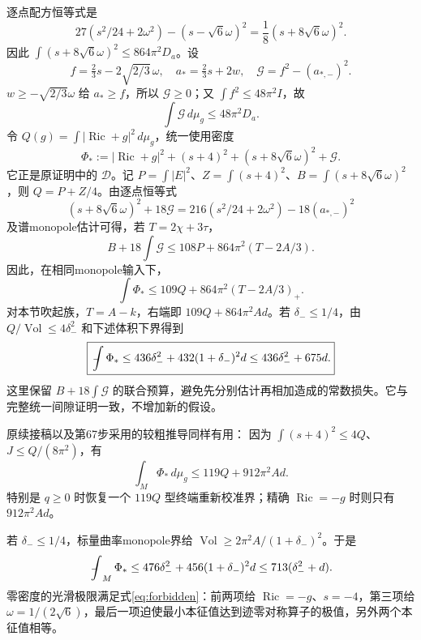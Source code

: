 \documentclass[UTF8,a4paper,11pt,fontset=fandol]{ctexart}
\numberwithin{equation}{section}
\theoremstyle{definition}
\newcommand{\Ric}{\operatorname{Ric}}
\newcommand{\Vol}{\operatorname{Vol}}
\newcommand{\dd}{\,d\mu_g}
\newcommand{\fint}{\mathop{\rlap{\,\raisebox{0.1ex}{\tiny$-$}}\int}\nolimits}
\begin{document}
逐点配方恒等式是
\begin{equation}\label{eq:square}
27(s^2/24+2\omega^2)-(s-\sqrt6\omega)^2
=\frac18(s+8\sqrt6\omega)^2.
\end{equation}
因此 $\int(s+8\sqrt6\omega)^2\le864\pi^2D_a$。设
\[
f=\tfrac23s-2\sqrt{2/3}\,\omega,\quad a_*=\tfrac23s+2w,
\quad\mathcal G=f^2-(a_{*,-})^2.
\]
$w\ge-\sqrt{2/3}\omega$ 给 $a_*\ge f$，所以 $\mathcal G\ge0$；又 $\int f^2\le48\pi^2I$，故
\begin{equation}
\int\mathcal G\dd\le48\pi^2D_a.
\end{equation}
令 $Q(g)=\int|\Ric+g|^2\dd$，统一使用密度
\begin{equation}\label{eq:Phistar}
\Phi_*:=|\Ric+g|^2+(s+4)^2+(s+8\sqrt6\omega)^2+\mathcal G.
\end{equation}
它正是原证明中的 $\mathcal D$。记 $P=\int|E|^2$、$Z=\int(s+4)^2$、$B=\int(s+8\sqrt6\omega)^2$，则 $Q=P+Z/4$。由逐点恒等式
\begin{equation}\label{eq:joint-density-identity}
(s+8\sqrt6\omega)^2+18\mathcal G
=216(s^2/24+2\omega^2)-18(a_{*,-})^2
\end{equation}
及谱monopole估计可得，若 $T=2\chi+3\tau$，
\[
B+18\int\mathcal G\le108P+864\pi^2(T-2A/3).
\]
因此，在相同monopole输入下，
\begin{equation}\label{eq:109}
\boxed{\int\Phi_*\le109Q+864\pi^2(T-2A/3)_+.}
\end{equation}
对本节吹起族，$T=A-k$，右端即 $109Q+864\pi^2Ad$。若 $\delta_-\le1/4$，由 $Q/\Vol\le4\delta_-^2$ 和下述体积下界得到
\begin{equation}\label{eq:436675}
\boxed{\fint\Phi_*\le436\delta_-^2+432(1+\delta_-)^2d
\le436\delta_-^2+675d.}
\end{equation}
这里保留 $B+18\int\mathcal G$ 的联合预算，避免先分别估计再相加造成的常数损失。它与完整统一间隙证明一致，不增加新的假设。

原续接稿以及第67步采用的较粗推导同样有用：
因为 $\int(s+4)^2\le4Q$、$J\le Q/(8\pi^2)$，有
\begin{equation}\label{eq:119}
\boxed{\int_M\Phi_*\dd\le119Q+912\pi^2 A d.}
\end{equation}
特别是 $q\ge0$ 时恢复一个 $119Q$ 型终端重新校准界；精确 $\Ric=-g$ 时则只有 $912\pi^2Ad$。

若 $\delta_-\le1/4$，标量曲率monopole界给 $\Vol\ge2\pi^2A/(1+\delta_-)^2$。于是
\begin{equation}\label{eq:meanPhi}
\fint_M\Phi_*\le476\delta_-^2+456(1+\delta_-)^2d
\le713(\delta_-^2+d).
\end{equation}
零密度的光滑极限满足式\eqref{eq:forbidden}：前两项给 $\Ric=-g$、$s=-4$，第三项给 $\omega=1/(2\sqrt6)$，最后一项迫使最小本征值达到迹零对称算子的极值，另外两个本征值相等。
\end{document}
